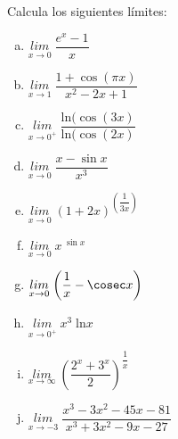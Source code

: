 	\begin{ejre} Calcula los siguientes límites:
	\begin{multicols}{2}
	\begin{enumerate} [a) ]
	\item $\underset {x \to 0 }{lim} \; {\dfrac {e^x-1} {x} }$
	\item $\underset {x\to 1 }{lim}\; {\dfrac {1+\cos (\pi x)}{x^2-2x+1} }$
	\item $\underset {x\to 0^+ }{lim} \; { \dfrac {\mathrm{ln} (\cos (3x)} {\mathrm{ln}  (\cos (2x)} } $
	\item $\underset {x\to 0} {lim} \; {\dfrac {x-\sin x}{x^3}}$
	\item $\underset {x\to 0} {lim}\; { (1+2x) ^ {\left( \dfrac {1} {3x} \right) }} $
	\item $\underset {x\to 0}{lim}\; {x^{\; \sin x}}$
	\item $\underset {x\to 0 }{lim}\; {\left(\dfrac 1 x -\cosec x  \right)}$
	\item $\underset {x\to 0^+}{lim}\; {x^3 \; \mathrm{ln}x}$
	\item $\underset {x\to \infty}{lim}\;{ \left(  \dfrac {2^x+3^x}{2}   \right)  ^ { \dfrac {1}{x}  }   }$
	\item $\underset {x \to -3}{lim}\;{\dfrac {x^3-3x^2-45x-81}{x^3+3x^2-9x-27}}$
	\end{enumerate}
	\end{multicols}
		
	\end{ejre}
